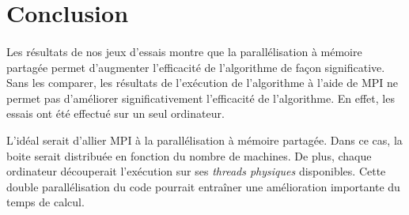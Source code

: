 \documentclass[a4paper]{article}
\begin{document}
\section{Conclusion}
    \paragraph{}
    Les résultats de nos jeux d'essais montre que la parallélisation à mémoire partagée permet d'augmenter l'efficacité de l'algorithme de façon significative. Sans les comparer, les résultats de l'exécution de l'algorithme à l'aide de MPI ne permet pas d'améliorer significativement l'efficacité de l'algorithme. En effet, les essais ont été effectué sur un seul ordinateur.
    
    L'idéal serait d'allier MPI à la parallélisation à mémoire partagée. Dans ce cas, la boite serait distribuée en fonction du nombre de machines. De plus, chaque ordinateur découperait l'exécution sur ses \emph{threads physiques} disponibles. Cette double parallélisation du code pourrait entraîner une amélioration importante du temps de calcul.
    
    
\end{document}
